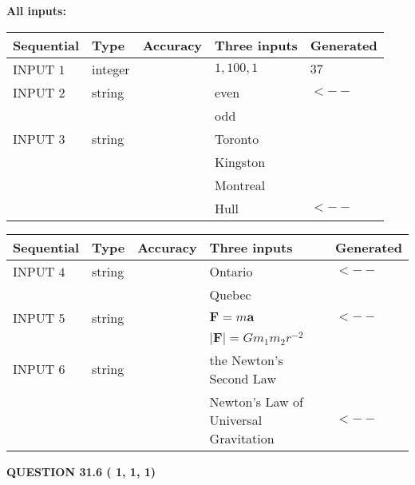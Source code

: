 \documentclass[12pt]{article}
\begin{document}
   
   
   
\noindent\vspace{0.1in}\hspace{-0.08in} {\textbf{\Large{All inputs: }}}
   
   
  
  
\noindent\begin{tabular}{|l|l|l|l|l|}
\hline
 Sequential & Type & Accuracy & Three inputs & Generated \\ 
\hline
 
 
  INPUT $           1$ & integer &  & $
 1
 , 
 100
 , 
 1
 $ & $ 37 $ 
 \\  \hline  
 
 
  INPUT $           2$ & string & & 
 even & 
  $ <-- $ 
  \\
  & & & 
 odd & 
 \\  \hline  
 
 
  INPUT $           3$ & string & & 
 Toronto & 
  \\
  & & & 
 Kingston & 
  \\
  & & & 
 Montreal & 
  \\
  & & & 
 Hull & 
  $ <-- $ 
 \\  \hline  
 \end{tabular}
   
   
  
  
\noindent\begin{tabular}{|l|l|l|l|l|}
\hline
 Sequential & Type & Accuracy & Three inputs & Generated \\ 
\hline
 
 
  INPUT $           4$ & string & & 
 Ontario & 
  $ <-- $ 
  \\
  & & & 
 Quebec & 
 \\  \hline  
 
 
  INPUT $           5$ & string & & 
 $\mathbf{F}=m\mathbf{a}$ & 
  $ <-- $ 
  \\
  & & & 
 $\left| \mathbf{F}\right| =Gm_1m_2r^{-2}$ & 
 \\  \hline  
 
 
  INPUT $           6$ & string & & 
 the Newton's Second Law & 
  \\
  & & & 
 Newton's Law of Universal Gravitation & 
  $ <-- $ 
 \\  \hline  
 \end{tabular}
   
   
  
\vspace{0.2in}
  
{\textbf{\Large{QUESTION
31.6 
 (          1,          1,          1)
}}}
  
\end{document}
